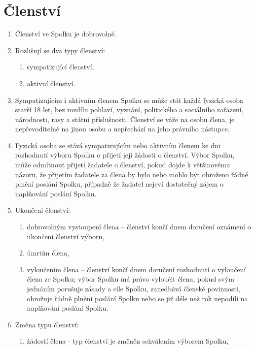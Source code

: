 \documentclass[11pt,a4paper]{article}
\begin{document}
\section{Členství}
\begin{enumerate}[itemsep=0pt]
    \item Členství ve Spolku je dobrovolné.
    \item Rozlišují se dva typy členství:
    \begin{enumerate}[itemsep=0pt,topsep=0pt]
        \item sympatizující členství,
        \item aktivní členství.
    \end{enumerate}
    \item Sympatizujícím i aktivním členem Spolku se může stát každá fyzická 
    osoba starší 18 let, bez rozdílu pohlaví, vyznání, politického a sociálního 
    zařazení, národnosti, rasy a státní příslušnosti. Členství se váže na osobu 
    člena, je nepřevoditelné na jinou osobu a nepřechází na jeho 
    právního nástupce. 
    \item Fyzická osoba se stává sympatizujícím nebo aktivním členem ke dni 
    rozhodnutí výboru Spolku o přijetí její žádosti o členství. Výbor Spolku, 
    může odmítnout přijetí žadatele o členství, pokud dojde k většinovému 
    názoru, že přijetím žadatele za člena by bylo nebo mohlo být ohroženo 
    řádné plnění poslání Spolku, případně že žadatel nejeví dostatečný zájem 
    o naplňování poslání Spolku.
    \item Ukončení členství:
    \begin{enumerate}[itemsep=0pt,topsep=0pt]
        \item dobrovolným vystoupení člena – členství končí dnem doručení 
        oznámení o ukončení členství výboru,
        \item úmrtím člena,
        \item vyloučením člena – členství končí dnem doručení rozhodnutí 
        o vyloučení člena ze Spolku; výbor Spolku má právo vyloučit člena, 
        pokud svým jednáním porušuje zásady a cíle Spolku, zanedbává členské 
        povinnosti, ohrožuje řádně plnění poslání Spolku nebo se již déle než 
        rok nepodílí na naplňování poslání Spolku.
    \end{enumerate}
    \item Změna typu členství:
    \begin{enumerate}[itemsep=0pt,topsep=0pt]
        \item žádostí člena - typ členství je změněn schválením výborem Spolku,

\end{enumerate}
\end{enumerate}
\end{document}

